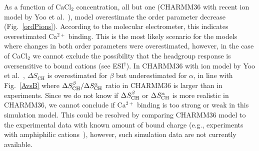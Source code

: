 \documentclass[twoside,twocolumn,9pt]{article}
\begin{document}
As a function of CaCl$_2$ concentration, all but one (CHARMM36 with recent ion model by Yoo et al.~\cite{yoo16}),
model overestimate the order parameter decrease (Fig.~\ref{ordPions}). 
According to the molecular electrometer, this indicates overestimated Ca$^{2+}$ binding. 
This is the most likely scenario for the models where changes in both order parameters were overestimated,
however, in the case of CaCl$_2$ we cannot exclude the possibility that the headgroup response is oversensitive to
bound cations (see ESI$^\dag$).
In CHARMM36 with ion model by Yoo et al.~\cite{yoo16},
$\Delta S_\mathrm{CH}$ is overestimated for $\beta$  but underestimated for  $\alpha$,
in line with Fig.~\ref{AvsB} where $\Delta S_{\rm{CH}}^{\beta}/\Delta S_{\rm{CH}}^{\alpha}$ ratio
in CHARMM36 is larger  than in experiments. Since we do not know if $\Delta S_{\rm{CH}}^{\beta}$ or $\Delta S_{\rm{CH}}^{\alpha}$
is more realistic in CHARMM36, we cannot conclude if Ca$^{2+}$ binding is too strong or weak in this simulation model.
This could be resolved by comparing CHARMM36 model to the experimental data with known amount of bound charge 
(e.g., experiments with amphiphilic cations~\cite{scherer89,franzin98}), however, such simulation data are not
currently available.
\end{document}
